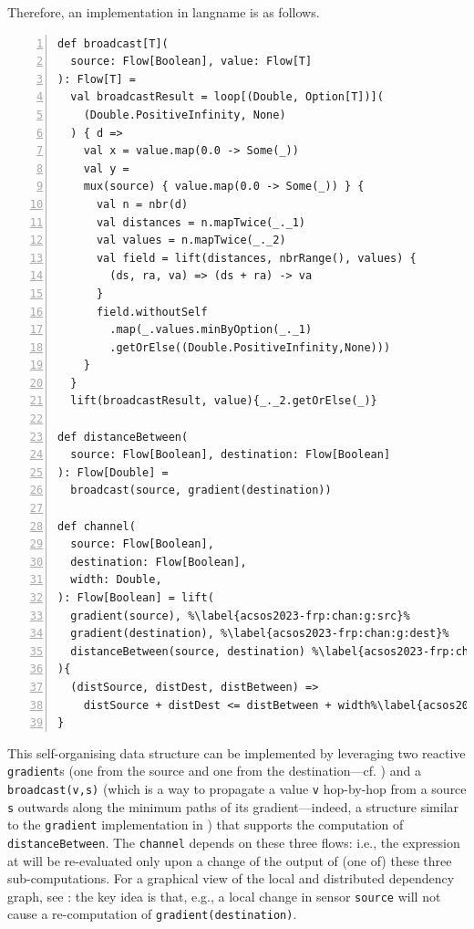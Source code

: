 \begin{example}\label{acsos2023-frp:ex:channel}
%

Therefore, an implementation in \ac{langname} is as follows.

\begin{minipage}{\columnwidth}
\begin{lstlisting}[escapechar=\%,numbers=left,xleftmargin=0.3cm,numbersep=4pt, caption=Channel implemented with FRASP]
def broadcast[T](
  source: Flow[Boolean], value: Flow[T]
): Flow[T] =
  val broadcastResult = loop[(Double, Option[T])](
    (Double.PositiveInfinity, None)
  ) { d =>
    val x = value.map(0.0 -> Some(_))
    val y =
    mux(source) { value.map(0.0 -> Some(_)) } {
      val n = nbr(d)
      val distances = n.mapTwice(_._1)
      val values = n.mapTwice(_._2)
      val field = lift(distances, nbrRange(), values) {
        (ds, ra, va) => (ds + ra) -> va
      }
      field.withoutSelf
        .map(_.values.minByOption(_._1)
        .getOrElse((Double.PositiveInfinity,None)))
    }
  }
  lift(broadcastResult, value){_._2.getOrElse(_)}

def distanceBetween(
  source: Flow[Boolean], destination: Flow[Boolean]
): Flow[Double] =
  broadcast(source, gradient(destination))

def channel(
  source: Flow[Boolean],
  destination: Flow[Boolean],
  width: Double,
): Flow[Boolean] = lift(
  gradient(source), %\label{acsos2023-frp:chan:g:src}%
  gradient(destination), %\label{acsos2023-frp:chan:g:dest}%
  distanceBetween(source, destination) %\label{acsos2023-frp:chan:distbetw}%
){
  (distSource, distDest, distBetween) =>
    distSource + distDest <= distBetween + width%\label{acsos2023-frp:src:chan:expr}%
}
\end{lstlisting}
\end{minipage}
%
This self-organising data structure can be implemented by leveraging two reactive \lstinline|gradient|s (one from the source and one from the destination---cf. )
 and a \lstinline|broadcast(v,s)| (which is a way to propagate a value \texttt{v} hop-by-hop from a source \texttt{s} outwards along the  minimum paths of its gradient---indeed,
a structure similar to the \lstinline|gradient| implementation in ) that supports the computation of \lstinline|distanceBetween|.
%
The \lstinline|channel| depends on these three flows: i.e.,
the expression at 
will be re-evaluated only upon a change of the output of (one of) these three sub-computations.
%
For a graphical view of the local and distributed dependency graph, see : the key idea is that, e.g., a local change in sensor \lstinline|source| will not cause a re-computation of \lstinline|gradient(destination)|.


\end{example}
